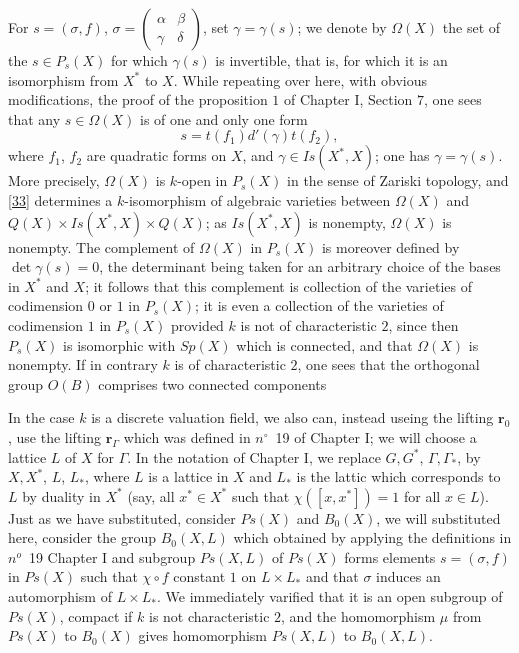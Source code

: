 \documentclass[12pt]{amsart}
\def\br{{\mathbf{r}}}
\newcounter{ssection}
\renewcommand{\subsection}{
  \addtocounter{ssection}{1}{\bf  \arabic{ssection}.\  }}
\begin{document}
For $s=(\sigma,f)$, $\sigma=\left(\begin{array}{cc}
\alpha & \beta\\
\gamma & \delta\end{array}\right)$, set $\gamma=\gamma(s)$; we denote by $\Omega(X)$ the set of the
$s\in P_{s}(X)$ for which $\gamma(s)$ is invertible, that is, for
which it is an isomorphism from $X^{*}$ to $X$. While repeating
over here, with obvious modifications, the proof of the proposition
$1$ of Chapter I, Section $7$, one sees that any $s\in\Omega(X)$
is of one and only one form\begin{equation}
s=t(f_{1})d'(\gamma)t(f_{2}),\label{33}\end{equation}
where $f_{1}$, $f_{2}$ are quadratic forms on $X$, and $\gamma\in Is(X^{*},X)$;
one has $\gamma=\gamma(s)$. More precisely, $\Omega(X)$ is $k$-open
in $P_{s}(X)$ in the sense of Zariski topology, and \ref{33} determines
a $k$-isomorphism of algebraic varieties between $\Omega(X)$ and
$Q(X)\times Is(X^{*},X)\times Q(X)$; as $Is(X^{*},X)$ is nonempty,
$\Omega(X)$ is nonempty. The complement of $\Omega(X)$ in $P_{s}(X)$
is moreover defined by $\det\gamma(s)=0$, the determinant being taken
for an arbitrary choice of the bases in $X^{*}$ and $X$; it follows
that this complement is collection of the varieties of codimension
$0$ or $1$ in $P_{s}(X)$; it is even a collection of the varieties
of codimension $1$ in $P_{s}(X)$ provided $k$ is not of characteristic
$2$, since then $P_{s}(X)$ is isomorphic with $Sp(X)$ which is
connected, and that $\Omega(X)$ is nonempty. If in contrary $k$
is of characteristic $2$, one sees that the orthogonal group $O(B)$
comprises two connected components

\subsection{}

\setcounter{ssection}{35}
\subsection{}
 In the case $k$ is a discrete valuation field,
we also can, instead useing the lifting $\br_0$, 
use the lifting $\br_\Gamma$ which was defined in $n^\circ$~19 of Chapter I;
we will choose a lattice $L$ of $X$ for $\Gamma$. In the notation of Chapter I, 
we replace $G, G^*$, 
$\Gamma, \Gamma_*$, by $X, X^*$, $L$, $L_*$, where $L$ is a lattice in $X$ and $L_*$
is the lattic which corresponds to $L$ by duality in $X^*$
(say, all $x^*\in X^*$ such that $\chi([x, x^*]) =1$ for all $x\in L$).
Just as we have substituted,  consider $Ps(X)$ and $B_0(X)$,
we will substituted here, consider the group $B_0(X, L)$ 
which obtained by applying the definitions in $n^o$~19 Chapter I and 
subgroup $Ps(X, L)$ of $Ps(X)$ forms elements $s=(\sigma, f)$ in $Ps(X)$
such that $\chi\circ f$ constant $1$ on $L\times L_*$ and that $\sigma$
induces an automorphism of $L\times L_*$. 
We immediately varified that it is an open subgroup of $Ps(X)$,
compact if $k$ is not characteristic $2$,
and the homomorphism $\mu$ from $Ps(X)$ to $B_0(X)$
 gives homomorphism $Ps(X, L)$ to $B_0(X, L)$. 
\end{document}
